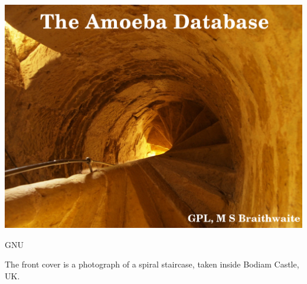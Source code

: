 \documentclass[11pt]{article}
\begin{document}
\thispagestyle{empty}
\pagestyle{empty}
\pagecolor{black}
\noindent
\newline
\newline
\newline
\begin{center}
\includegraphics[scale=2]{Amoeba-Cover.jpg}
\end{center}
\noindent
\newline
\newline
\newline
\newline
\newline
\newline
\newline
\newline
\begin{center}
\huge{\color{white} GNU}
\end{center}
\newpage
\pagecolor{white}
\noindent
\newline
\newline
\newline
\newline
\newline
\newline
\newline
\newline
\newline
\newline
\begin{center}
The front cover is a photograph of a spiral staircase, taken inside Bodiam Castle, UK.
\end{center}
\newpage
\thispagestyle{empty}
\setcounter{tocdepth}{2}
\tableofcontents
\newpage
\setcounter{page}{1}
\pagestyle{headings}
\end{document}
